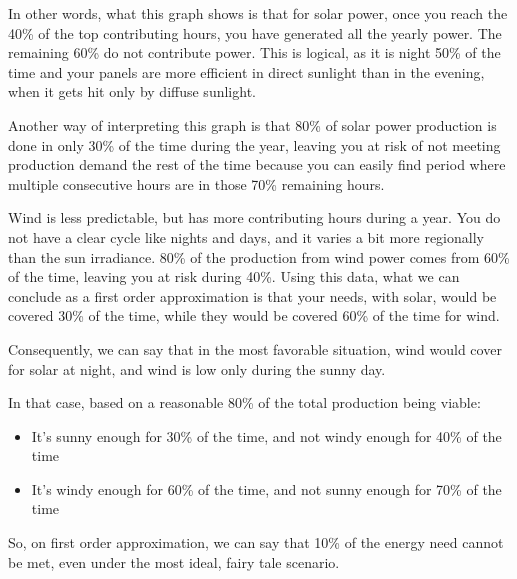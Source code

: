 In other words, what this graph shows is that for solar power, once you reach the 40\% of the top contributing hours, you have generated all the yearly power. The remaining 60\% do not contribute power. This is logical, as it is night 50\% of the time and your panels are more efficient in direct sunlight than in the evening, when it gets hit only by diffuse sunlight.

Another way of interpreting this graph is that 80\% of solar power production is done in only 30\% of the time during the year, leaving you at risk of not meeting production demand the rest of the time because you can easily find period where multiple consecutive hours are in those 70\% remaining hours.

Wind is less predictable, but has more contributing hours during a year. You do not have a clear cycle like nights and days, and it varies a bit more regionally than the sun irradiance. 80\% of the production from wind power comes from 60\% of the time, leaving you at risk during 40\%. Using this data, what we can conclude as a first order approximation is that your needs, with solar, would be covered 30\% of the time, while they would be covered 60\% of the time for wind.

Consequently, we can say that in the most favorable situation, wind would cover for solar at night, and wind is low only during the sunny day.

\begin{remark}
In that case, based on a reasonable 80\% of the total production being viable:

\begin{itemize}
\item It's sunny enough for 30\% of the time, and not windy enough for 40\% of the time
\item It's windy enough for 60\% of the time, and not sunny enough for 70\% of the time
\end{itemize}

So, on first order approximation, we can say that 10\% of the energy need cannot be met, even under the most ideal, fairy tale scenario.

\end{remark}

